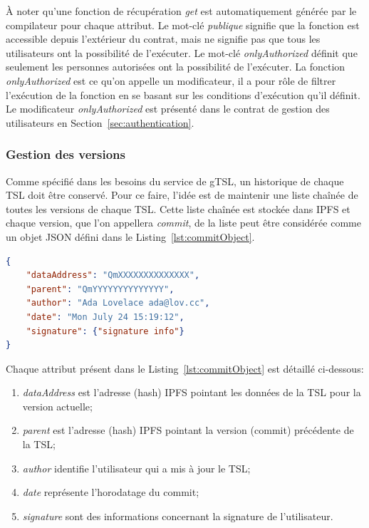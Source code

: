 \documentclass{tnreport}
\begin{document}
À noter qu'une fonction de récupération {\em get} est automatiquement générée par le compilateur pour chaque attribut. Le mot-clé {\em publique} signifie que la fonction est accessible depuis l'extérieur du contrat, mais ne signifie pas que tous les utilisateurs ont la possibilité de l'exécuter. Le mot-clé {\em onlyAuthorized} définit que seulement les personnes autorisées ont la possibilité de l'exécuter. La fonction {\em onlyAuthorized} est ce qu'on appelle un modificateur, il a pour rôle de filtrer l'exécution de la fonction en se basant sur les conditions d'exécution qu'il définit. Le modificateur {\em onlyAuthorized} est présenté dans le contrat de gestion des utilisateurs en Section~\ref{sec:authentication}.

\subsubsection{Gestion des versions}

Comme spécifié dans les besoins du service de gTSL, un historique de chaque TSL doit être conservé. 
Pour ce faire, l'idée est de maintenir une liste chaînée de toutes les versions de chaque TSL.
Cette liste chaînée est stockée dans IPFS et chaque version, que l'on appellera {\em commit}, de la liste peut être considérée comme un objet JSON défini dans le Listing~\ref{lst:commitObject}.

\begin{lstlisting}[language=json, basicstyle=\small, caption={Commit Object}, label={lst:commitObject}]
{
	"dataAddress": "QmXXXXXXXXXXXXXX",
	"parent": "QmYYYYYYYYYYYYYY",
	"author": "Ada Lovelace ada@lov.cc",
	"date": "Mon July 24 15:19:12",
	"signature": {"signature info"}
}
\end{lstlisting}

Chaque attribut présent dans le Listing~\ref{lst:commitObject} est détaillé ci-dessous:
\begin{enumerate}
	\item \textit{dataAddress} est l'adresse (hash) IPFS pointant les données de la TSL pour la version actuelle;
	\item \textit{parent} est l'adresse (hash) IPFS pointant la version (commit) précédente de la TSL;
	\item \textit{author} identifie l'utilisateur qui a mis à jour le TSL;
	\item \textit{date} représente l'horodatage du commit;
	\item \textit{signature} sont des informations concernant la signature de l'utilisateur.
\end{enumerate}
\end{document}
